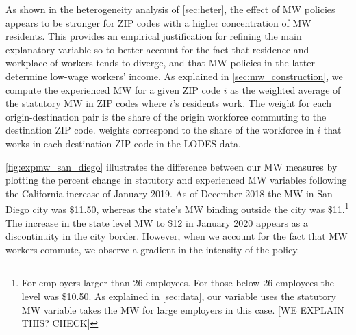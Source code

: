 As shown in the heterogeneity analysis of \autoref{sec:heter}, the effect of MW policies 
appears to be stronger for ZIP codes with a higher concentration of MW residents. This 
provides an empirical justification for refining the main explanatory variable so to 
better account for the fact that residence and workplace of workers tends to diverge, 
and that MW policies in the latter determine low-wage workers' income. As explained in 
\autoref{sec:mw_construction}, we compute the experienced MW for a given ZIP code $i$ as 
the weighted average of the statutory MW in ZIP codes where $i$'s residents  work.
The weight for each origin-destination pair is the share of the origin workforce commuting to
the destination ZIP code. weights correspond to the share of the workforce in $i$ that works in 
each destination ZIP code in the LODES data.

\autoref{fig:expmw_san_diego} illustrates the difference between our MW measures by plotting 
the percent change in statutory and experienced MW variables following the California 
increase of January 2019. As of December 2018 the MW in San Diego city was \$11.50, 
whereas the state's MW binding outside the city was \$11.\footnote{For employers larger 
	than 26 employees. For those below 26 employees the level was \$10.50. As explained in 
	\autoref{sec:data}, our variable uses the statutory MW variable takes the MW for
	large employers in this case. [WE EXPLAIN THIS? CHECK]}
The increase in the state level MW to \$12 in January 2020 appears as a discontinuity in the 
city border. However, when we account for the fact that MW workers commute, we observe a 
gradient in the intensity of the policy.

